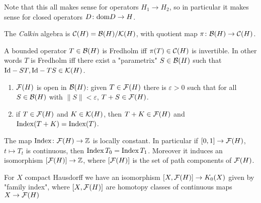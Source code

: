 \noindent Note that this all makes sense for operators $H_1\to H_2$, so in particular it makes sense for closed operators $D\colon\mathrm{dom} D\to H$.

\begin{definition}
 The \emph{Calkin} algebra is $\mathcal{C}(H)=\mathcal{B}(H)/\mathcal{K}(H)$, with quotient map $\pi\colon\mathcal{B}(H)\to\mathcal{C}(H)$.
\end{definition}

\begin{theorem}[Atkinson]
 A bounded operator $T\in\mathcal{B}(H)$ is Fredholm iff $\pi(T)\in\mathcal{C}(H)$ is invertible. In other words $T$ is Fredholm iff there exist a "parametrix" $S\in\mathcal{B}(H)$ such that $\mathrm{Id}-ST,\mathrm{Id}-TS\in\mathcal{K}(H)$. 
\end{theorem}

\begin{corollary}\noindent
 \begin{enumerate}
  \item $\mathcal{F}(H)$ is open in $\mathcal{B}(H)$: given $T\in\mathcal{F}(H)$ there is $\varepsilon>0$ such that for all $S\in\mathcal{B}(H)$ with $\|S\|<\varepsilon$, $T+S\in\mathcal{F}(H)$.
  \item if $T\in\mathcal{F}(H)$ and $K\in\mathcal{K}(H)$, then $T+K\in\mathcal{F}(H)$ and $\mathrm{Index}(T+K)=\mathrm{Index}(T)$.
 \end{enumerate}
\end{corollary}

\begin{theorem}\label{thm: index_is_homotopy_invariant}
 The map $\mathrm{Index}\colon\mathcal{F}(H)\to\mathbb{Z}$ is locally constant. In particular if $[0,1]\to\mathcal{F}(H)$, $t\mapsto T_t$ is continuous, then $\mathrm{Index} \,T_0=\mathrm{Index}\, T_1$. Moreover it induces an isomorphism $[\mathcal{F}(H)]\to\mathbb{Z}$, where $[\mathcal{F}(H)]$ is the set of path components of $\mathcal{F}(H)$.
\end{theorem}

\begin{theorem} 
 For $X$ compact Hausdorff we have an isomorphism $[X,\mathcal{F}(H)]\to K_0(X)$ given by "family index", where $[X,\mathcal{F}(H)]$ are homotopy classes of continuous maps $X\to\mathcal{F}(H)$
\end{theorem}
